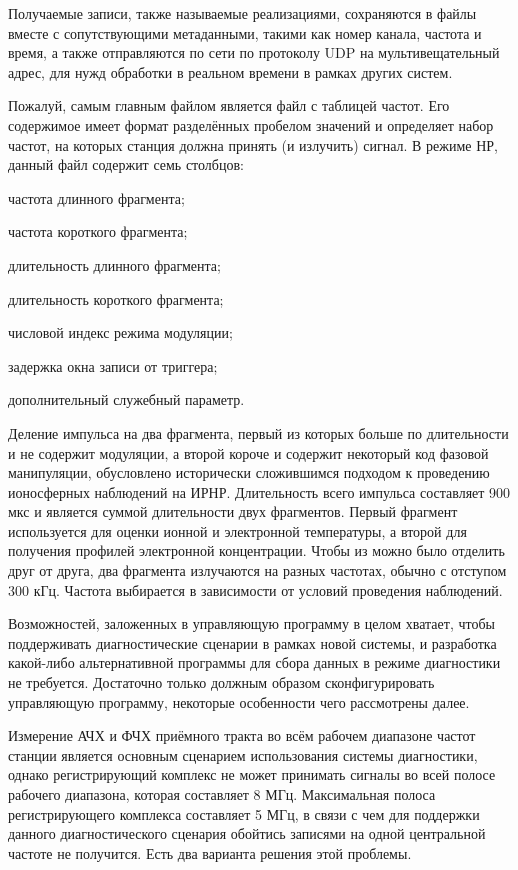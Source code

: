 \documentclass{report}
\begin{document}

Получаемые записи, также называемые реализациями, сохраняются в файлы вместе с сопутствующими метаданными, такими как номер канала, частота и время, а также отправляются по сети по протоколу UDP на мультивещательный адрес, для нужд обработки в реальном времени в рамках других систем.

Пожалуй, самым главным файлом является файл с таблицей частот. Его содержимое имеет формат разделённых пробелом значений и определяет набор частот, на которых станция должна принять (и излучить) сигнал. В режиме НР, данный файл содержит семь столбцов:

\begin{enummarker}
    \item частота длинного фрагмента;
    \item частота короткого фрагмента;
    \item длительность длинного фрагмента;
    \item длительность короткого фрагмента;
    \item числовой индекс режима модуляции;
    \item задержка окна записи от триггера;
    \item дополнительный служебный параметр.
\end{enummarker}

Деление импульса на два фрагмента, первый из которых больше по длительности и не содержит модуляции, а второй короче и содержит некоторый код фазовой манипуляции, обусловлено исторически сложившимся подходом к проведению ионосферных наблюдений на ИРНР. Длительность всего импульса составляет 900 мкс и является суммой длительности двух фрагментов. Первый фрагмент используется для оценки ионной и электронной температуры, а второй для получения профилей электронной концентрации. Чтобы из можно было отделить друг от друга, два фрагмента излучаются на разных частотах, обычно с отступом 300 кГц. Частота выбирается в зависимости от условий проведения наблюдений.

Возможностей, заложенных в управляющую программу в целом хватает, чтобы поддерживать диагностические сценарии в рамках новой системы, и разработка какой-либо альтернативной программы для сбора данных в режиме диагностики не требуется. Достаточно только должным образом сконфигурировать управляющую программу, некоторые особенности чего рассмотрены далее.

Измерение АЧХ и ФЧХ приёмного тракта во всём рабочем диапазоне частот станции является основным сценарием использования системы диагностики, однако регистрирующий комплекс не может принимать сигналы во всей полосе рабочего диапазона, которая составляет 8 МГц. Максимальная полоса регистрирующего комплекса составляет 5 МГц, в связи с чем для поддержки данного диагностического сценария обойтись записями на одной центральной частоте не получится. Есть два варианта решения этой проблемы.
\end{document}
